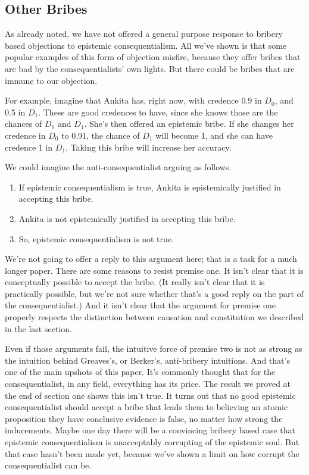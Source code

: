 \subsection{Other Bribes}
\label{otherbribes}

As already noted, we have not offered a general purpose response to bribery based objections to epistemic consequentialism. All we've shown is that some popular examples of this form of objection misfire, because they offer bribes that are bad by the consequentialists' own lights. But there could be bribes that are immune to our objection.

For example, imagine that Ankita has, right now, with credence 0.9 in $D_0$, and 0.5 in $D_1$. These are good credences to have, since she knows those are the chances of $D_0$ and $D_1$. She's then offered an epistemic bribe. If she changes her credence in $D_0$ to 0.91, the chance of $D_1$ will become 1, and she can have credence 1 in $D_1$. Taking this bribe will increase her accuracy.

We could imagine the anti-consequentialist arguing as follows.

\begin{enumerate}
\item If epistemic consequentialism is true, Ankita is epistemically justified in accepting this bribe.

\item Ankita is not epistemically justified in accepting this bribe.

\item So, epistemic consequentialism is not true.

\end{enumerate}
We're not going to offer a reply to this argument here; that is a task for a much longer paper. There are some reasons to resist premise one. It isn't clear that it is conceptually possible to accept the bribe. (It really isn't clear that it is practically possible, but we're not sure whether that's a good reply on the part of the consequentialist.) And it isn't clear that the argument for premise one properly respects the distinction between causation and constitution we described in the last section.

Even if those arguments fail, the intuitive force of premise two is not as strong as the intuition behind Greaves's, or Berker's, anti-bribery intuitions. And that's one of the main upshots of this paper. It's commonly thought that for the consequentialist, in any field, everything has its price. The result we proved at the end of section one shows this isn't true. It turns out that no good epistemic consequentialist should accept a bribe that leads them to believing an atomic proposition they have conclusive evidence is false, no matter how strong the inducements. Maybe one day there will be a convincing bribery based case that epistemic consequentialism is unacceptably corrupting of the epistemic soul. But that case hasn't been made yet, because we've shown a limit on how corrupt the consequentialist can be.



